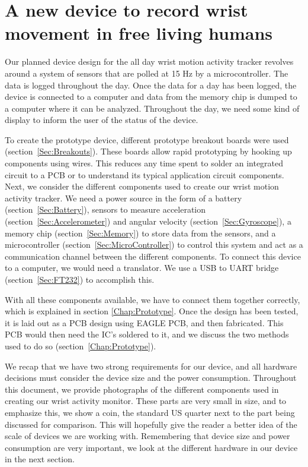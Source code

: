 \chapter{A new device to record wrist movement in free living humans}
\label{Chap:Methods}

Our planned device design for the all day wrist motion activity tracker revolves
around a system of sensors that are polled at 15 Hz by a microcontroller.
The data is logged throughout the day.
Once the data for a day has been logged, the device is connected
to a computer and data from the memory chip is dumped
to a computer where it can be analyzed.
Throughout the day,
we need some kind of display to inform the user of the status of the device.

To create the prototype device,
different prototype breakout boards were used (section~\ref{Sec:Breakouts}).
These boards allow rapid prototyping by hooking up components using wires.
This reduces any time spent to solder an integrated circuit to a PCB or
to understand its typical application circuit components.
Next, we consider the different components used to create our wrist motion activity tracker.
We need a power source in the form of a battery (section~\ref{Sec:Battery}),
sensors to measure acceleration (section~\ref{Sec:Accelerometer})
and angular velocity (section~\ref{Sec:Gyroscope}),
a memory chip (section~\ref{Sec:Memory}) to store data from the sensors,
and a microcontroller (section~\ref{Sec:MicroController}) to control this system
and act as a communication channel between the different components.
To connect this device to a computer, we would need a translator.
We use a USB to UART bridge (section~\ref{Sec:FT232}) to accomplish this.

With all these components available,
we have to connect them together correctly,
which is explained in section \ref{Chap:Prototype}.
Once the design has been tested,
it is laid out as a PCB design using EAGLE PCB,
and then fabricated.
This PCB would then need the IC's soldered to it,
and we discuss the two methods used to do so (section~\ref{Chap:Prototype}).

We recap that we have two strong requirements for our device, and all hardware decisions must consider the device size
and the power consumption.
Throughout this document,
we provide photographs of the different components used in creating our wrist activity monitor.
These parts are very small in size,
and to emphasize this,
we show a coin,
the standard US quarter next to the part being discussed for comparison.
This will hopefully give the reader a better idea of the scale of devices we are working with.
Remembering that device size and power consumption are very important,
we look at the different hardware in our device in the next section.

